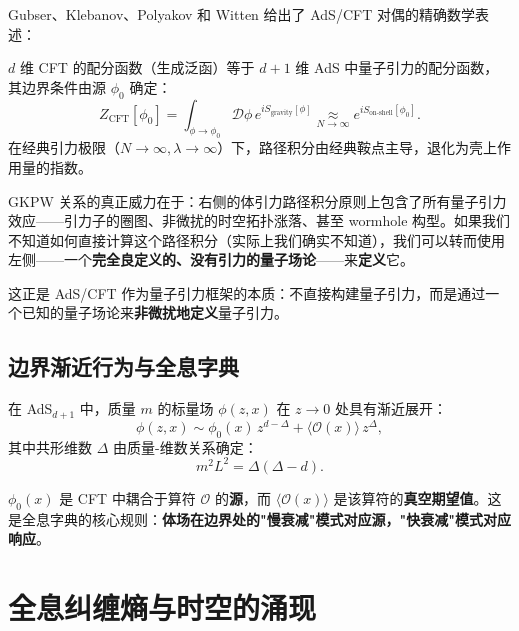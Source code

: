 Gubser、Klebanov、Polyakov \cite{Gubser1998} 和 Witten \cite{Witten1998} 给出了 AdS/CFT 对偶的精确数学表述：

\begin{theorem}[GKPW 关系]
    $d$ 维 CFT 的配分函数（生成泛函）等于 $d+1$ 维 AdS 中量子引力的配分函数，其边界条件由源 $\phi_0$ 确定：
    \begin{equation}
        \boxed{Z_{\text{CFT}}[\phi_0] = \int_{\phi \to \phi_0} \mathcal{D}\phi \, e^{i S_{\text{gravity}}[\phi]} \underset{N \to \infty}{\approx} e^{i S_{\text{on-shell}}[\phi_0]}}.
    \end{equation}
    在经典引力极限（$N \to \infty, \lambda \to \infty$）下，路径积分由经典鞍点主导，退化为壳上作用量的指数。
\end{theorem}

\begin{note}
    GKPW 关系的真正威力在于：右侧的体引力路径积分原则上包含了所有量子引力效应——引力子的圈图、非微扰的时空拓扑涨落、甚至 wormhole 构型。如果我们不知道如何直接计算这个路径积分（实际上我们确实不知道），我们可以转而使用左侧——一个\textbf{完全良定义的、没有引力的量子场论}——来\textbf{定义}它。

    这正是 AdS/CFT 作为量子引力框架的本质：不直接构建量子引力，而是通过一个已知的量子场论来\textbf{非微扰地定义}量子引力。
\end{note}

\subsection{边界渐近行为与全息字典}

在 AdS$_{d+1}$ 中，质量 $m$ 的标量场 $\phi(z,x)$ 在 $z \to 0$ 处具有渐近展开：
\begin{equation}
    \phi(z,x) \sim \phi_0(x) \, z^{d-\Delta} + \langle\mathcal{O}(x)\rangle \, z^{\Delta},
\end{equation}
其中共形维数 $\Delta$ 由质量-维数关系确定：
\begin{equation}
    \boxed{m^2 L^2 = \Delta(\Delta - d)}.
\end{equation}

$\phi_0(x)$ 是 CFT 中耦合于算符 $\mathcal{O}$ 的\textbf{源}，而 $\langle\mathcal{O}(x)\rangle$ 是该算符的\textbf{真空期望值}。这是全息字典的核心规则：\textbf{体场在边界处的"慢衰减"模式对应源，"快衰减"模式对应响应}。

\section{全息纠缠熵与时空的涌现}

